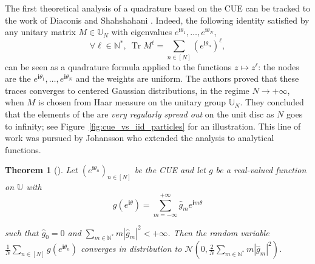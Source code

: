 \documentclass[twoside,11pt]{book}
\newtheorem{theorem}{Theorem}
\numberwithin{theorem}{chapter}
\numberwithin{definition}{chapter}
\numberwithin{proposition}{chapter}
\numberwithin{corollary}{chapter}
\numberwithin{example}{chapter}
\numberwithin{lemma}{chapter}
\numberwithin{assumption}{chapter}
\DeclareMathOperator{\Tr}{Tr}
\begin{document}


The first theoretical analysis of a  quadrature based on the CUE can be tracked to the work of Diaconis and Shahshahani \citep{DiSh94}. Indeed, the following identity satisfied by any unitary matrix $M \in \mathbb{U}_{N}$ with eigenvalues $e^{\mathbf{i} \theta_{1}}, \dots, e^{\mathbf{i} \theta_{N}}$,
\begin{equation}
\forall \ell \in \mathbb{N}^{*}, \: \Tr M^{\ell}  = \sum\limits_{n \in [N]} (e^{\mathbf{i} \theta_{n}})^{\ell},
\end{equation}
can be seen as a quadrature formula applied to the functions $z \mapsto z^{\ell}$: the nodes are the $e^{\mathbf{i} \theta_{1}}, \dots, e^{\mathbf{i} \theta_{N}}$ and the weights are uniform.
  The authors proved that these traces converges to centered Gaussian distributions, in the regime $N \rightarrow +\infty$, when $M$ is chosen from Haar measure on the unitary group $\mathbb{U}_{N}$. They concluded that the elements of the are \emph{very regularly spread out} on the unit disc as $N$ goes to infinity; see Figure~\ref{fig:cue_vs_iid_particles} for an illustration. This line of work was pursued by Johansson who extended the analysis to analytical functions.


\begin{theorem}[\cite{Joh97}]
Let $(e^{\mathbf{i} \theta_{n}})_{n \in [N]}$ be the CUE and let $g$ be a real-valued function on $\mathbb{U}$ with 
\begin{equation}
g(e^{\mathbf{i}  \theta}) = \sum_{m =-\infty}^{+\infty} \hat{g}_{m}e^{\mathbf{i}  m \theta}
\end{equation}

 such that $\hat{g}_{0} = 0$ and $\sum_{m \in \mathbb{N}^{*}} m|\hat{g}_{m}|^{2} <+\infty$. Then the random variable $ \frac{1}{N}\sum_{n \in [N]} g(e^{\mathbf{i}\theta_{n}})$
converges in distribution to $ \mathcal{N}(0,\frac{2}{N}\sum_{m \in \mathbb{N}^{*}} m|\hat{g}_{m}|^{2})$.
\end{theorem}
\end{document}
